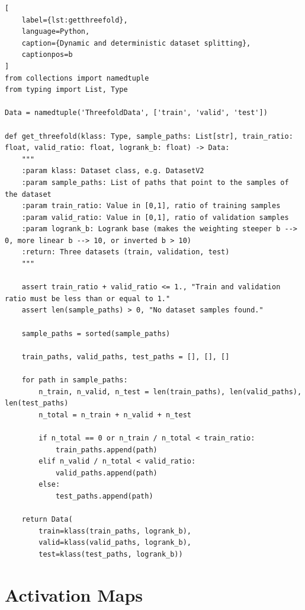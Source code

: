 \begin{lstlisting}[
    label={lst:getthreefold},
    language=Python,
    caption={Dynamic and deterministic dataset splitting},
    captionpos=b
]
from collections import namedtuple
from typing import List, Type

Data = namedtuple('ThreefoldData', ['train', 'valid', 'test'])

def get_threefold(klass: Type, sample_paths: List[str], train_ratio: float, valid_ratio: float, logrank_b: float) -> Data:
    """
    :param klass: Dataset class, e.g. DatasetV2
    :param sample_paths: List of paths that point to the samples of the dataset
    :param train_ratio: Value in [0,1], ratio of training samples
    :param valid_ratio: Value in [0,1], ratio of validation samples
    :param logrank_b: Logrank base (makes the weighting steeper b --> 0, more linear b --> 10, or inverted b > 10)
    :return: Three datasets (train, validation, test)
    """

    assert train_ratio + valid_ratio <= 1., "Train and validation ratio must be less than or equal to 1."
    assert len(sample_paths) > 0, "No dataset samples found."

    sample_paths = sorted(sample_paths)

    train_paths, valid_paths, test_paths = [], [], []

    for path in sample_paths:
        n_train, n_valid, n_test = len(train_paths), len(valid_paths), len(test_paths)
        n_total = n_train + n_valid + n_test

        if n_total == 0 or n_train / n_total < train_ratio:
            train_paths.append(path)
        elif n_valid / n_total < valid_ratio:
            valid_paths.append(path)
        else:
            test_paths.append(path)

    return Data(
        train=klass(train_paths, logrank_b),
        valid=klass(valid_paths, logrank_b),
        test=klass(test_paths, logrank_b))
\end{lstlisting}
\clearpage

\section{Activation Maps}


